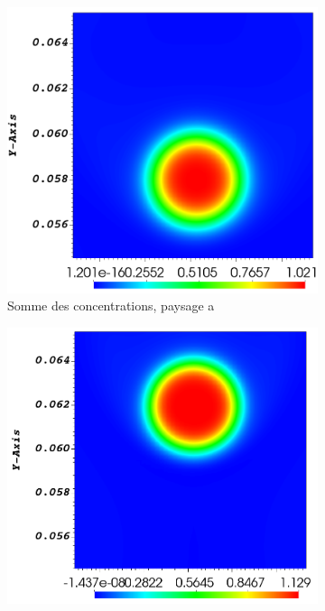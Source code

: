 \begin{figure}[H] 
	\centering
	\begin{subfigure}[H]{0.47\textwidth}
		\centering
		\includegraphics[width=\textwidth]{figure/somme_concentration_a_6s.png}
		\caption{Somme des concentrations, paysage a}
	\end{subfigure} 
	\begin{subfigure}[H]{0.47\textwidth}
		\centering
		\includegraphics[width=1.05\textwidth]{figure/somme_concentration_other_6s.png}

\end{subfigure}
\end{figure}
